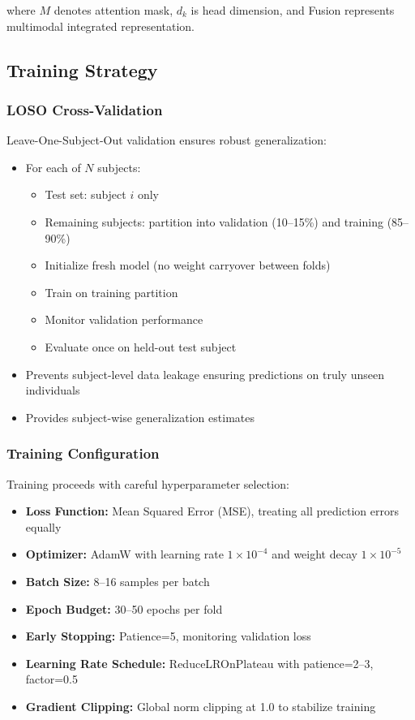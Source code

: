 \documentclass[12pt]{article}
\begin{document}
	where $M$ denotes attention mask, $d_k$ is head dimension, and Fusion represents multimodal integrated representation.

	\subsection{Training Strategy}

	\subsubsection{LOSO Cross-Validation}

	Leave-One-Subject-Out validation ensures robust generalization:

	\begin{itemize}
		\item For each of $N$ subjects:
		\begin{itemize}
			\item Test set: subject $i$ only
			\item Remaining subjects: partition into validation (10--15\%) and training (85--90\%)
			\item Initialize fresh model (no weight carryover between folds)
			\item Train on training partition
			\item Monitor validation performance
			\item Evaluate once on held-out test subject
		\end{itemize}

		\item Prevents subject-level data leakage ensuring predictions on truly unseen individuals
		\item Provides subject-wise generalization estimates
	\end{itemize}

	\subsubsection{Training Configuration}

	Training proceeds with careful hyperparameter selection:

	\begin{itemize}
		\item \textbf{Loss Function:} Mean Squared Error (MSE), treating all prediction errors equally
		\item \textbf{Optimizer:} AdamW with learning rate $1 \times 10^{-4}$ and weight decay $1 \times 10^{-5}$
		\item \textbf{Batch Size:} 8--16 samples per batch
		\item \textbf{Epoch Budget:} 30--50 epochs per fold
		\item \textbf{Early Stopping:} Patience=5, monitoring validation loss
		\item \textbf{Learning Rate Schedule:} ReduceLROnPlateau with patience=2--3, factor=0.5
		\item \textbf{Gradient Clipping:} Global norm clipping at 1.0 to stabilize training
	\end{itemize}
\end{document}
